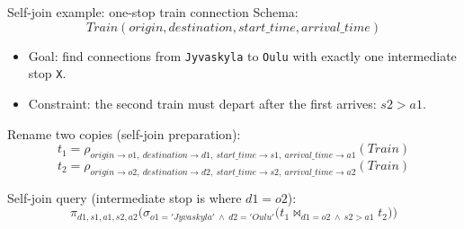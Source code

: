 \documentclass[10pt,aspectratio=169]{beamer}
\newcommand{\select}{\sigma}
\newcommand{\proj}{\pi}
\newcommand{\rename}{\rho}
\begin{document}
\begin{frame}{Self-join example: one-stop train connection}
\small
Schema:
\[
Train(origin,destination,start\_time,arrival\_time)
\]

\begin{itemize}
  \item Goal: find connections from \texttt{Jyvaskyla} to \texttt{Oulu}
        with exactly one intermediate stop \texttt{X}.
  \item Constraint: the second train must depart after the first arrives:
        \(s2 > a1\).
\end{itemize}

\vspace{0.4em}
Rename two copies (self-join preparation):
\[
t_1=\rename_{origin\rightarrow o1,\ destination\rightarrow d1,\ start\_time\rightarrow s1,\ arrival\_time\rightarrow a1}(Train)
\]
\[
t_2=\rename_{origin\rightarrow o2,\ destination\rightarrow d2,\ start\_time\rightarrow s2,\ arrival\_time\rightarrow a2}(Train)
\]

Self-join query (intermediate stop is where \(d1=o2\)):
\[
\proj_{d1,s1,a1,s2,a2}\Big(
\select_{o1='Jyvaskyla'\ \wedge\ d2='Oulu'}\big(
t_1\Join_{d1=o2\ \wedge\ s2>a1} t_2
\big)\Big)
\]
\end{frame}
\end{document}
